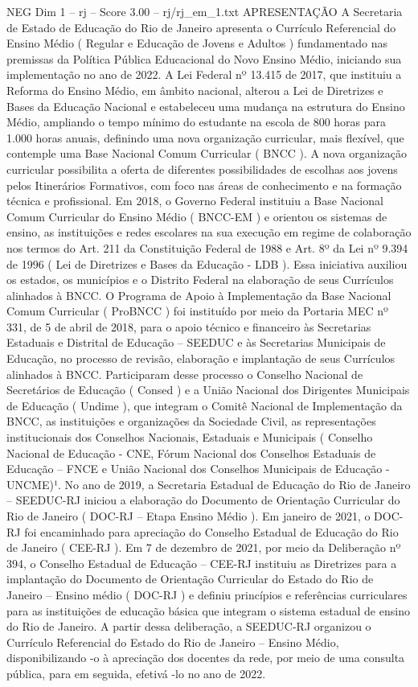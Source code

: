 \begin{textsample}{NEG Dim 1 – rj – Score 3.00 – rj/rj\_em\_1.txt}  \label{ex:f1_neg_006}
APRESENTAÇÃO A Secretaria de Estado de Educação do Rio de Janeiro apresenta o Currículo Referencial do Ensino Médio ( Regular e Educação de Jovens e Adultos ) fundamentado nas premissas da Política Pública Educacional do Novo Ensino Médio, iniciando sua implementação no ano de 2022.
A Lei Federal nº 13.415 de 2017, que instituiu a Reforma do Ensino Médio, em âmbito nacional, alterou a Lei de Diretrizes e Bases da Educação Nacional e estabeleceu uma mudança na estrutura do Ensino Médio, ampliando o tempo mínimo do estudante na escola de 800 horas para 1.000 horas anuais, definindo uma nova organização curricular, mais flexível, que contemple uma Base Nacional Comum Curricular ( BNCC ).
A nova organização curricular possibilita a oferta de diferentes possibilidades de escolhas aos jovens pelos Itinerários Formativos, com foco nas áreas de conhecimento e na formação técnica e profissional.
Em 2018, o Governo Federal instituiu a Base Nacional Comum Curricular do Ensino Médio ( BNCC-EM ) e orientou os sistemas de ensino, as instituições e redes escolares na sua execução em regime de colaboração nos termos do Art. 211 da Constituição Federal de 1988 e Art. 8º da Lei nº 9.394 de 1996 ( Lei de Diretrizes e Bases da Educação - LDB ).
Essa iniciativa auxiliou os estados, os municípios e o Distrito Federal na elaboração de seus Currículos alinhados à BNCC.
O Programa de Apoio à Implementação da Base Nacional Comum Curricular ( ProBNCC ) foi instituído por meio da Portaria MEC nº 331, de 5 de abril de 2018, para o apoio técnico e financeiro às Secretarias Estaduais e Distrital de Educação – SEEDUC e às Secretarias Municipais de Educação, no processo de revisão, elaboração e implantação de seus Currículos alinhados à BNCC.
Participaram desse processo o Conselho Nacional de Secretários de Educação ( Consed ) e a União Nacional dos Dirigentes Municipais de Educação ( Undime ), que integram o Comitê Nacional de Implementação da BNCC, as instituições e organizações da Sociedade Civil, as representações institucionais dos Conselhos Nacionais, Estaduais e Municipais ( Conselho Nacional de Educação - CNE, Fórum Nacional dos Conselhos Estaduais de Educação – FNCE e União Nacional dos Conselhos Municipais de Educação - UNCME)¹.
No ano de 2019, a Secretaria Estadual de Educação do Rio de Janeiro – SEEDUC-RJ iniciou a elaboração do Documento de Orientação Curricular do Rio de Janeiro ( DOC-RJ – Etapa Ensino Médio ).
Em janeiro de 2021, o DOC-RJ foi encaminhado para apreciação do Conselho Estadual de Educação do Rio de Janeiro ( CEE-RJ ).
Em 7 de dezembro de 2021, por meio da Deliberação nº 394, o Conselho Estadual de Educação – CEE-RJ instituiu as Diretrizes para a implantação do Documento de Orientação Curricular do Estado do Rio de Janeiro – Ensino médio ( DOC-RJ ) e definiu princípios e referências curriculares para as instituições de educação básica que integram o sistema estadual de ensino do Rio de Janeiro.
A partir dessa deliberação, a SEEDUC-RJ organizou o Currículo Referencial do Estado do Rio de Janeiro – Ensino Médio, disponibilizando -o à apreciação dos docentes da rede, por meio de uma consulta pública, para em seguida, efetivá -lo no ano de 2022.

\end{textsample}
